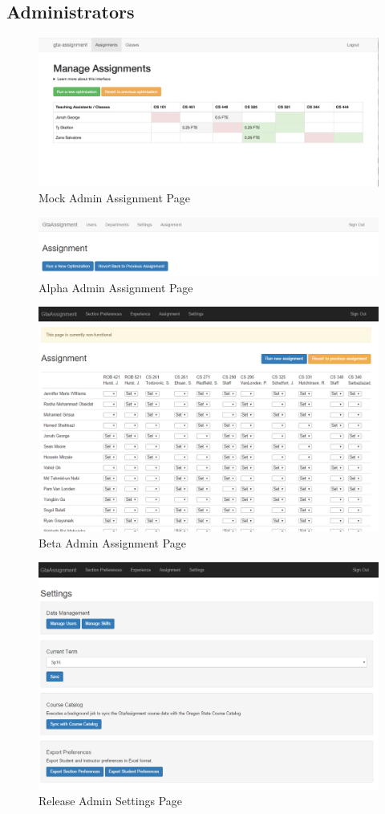 \subsection{Administrators}

\begin{figure}[!htb]
  \centering
  \includegraphics[width=0.75\linewidth]{images/administrator-assignment-design.png}
  \caption{Mock Admin Assignment Page}
\end{figure}

\begin{figure}[!htb]
  \centering
  \includegraphics[width=0.75\linewidth]{images/administrator-assignment-alpha.png}
  \caption{Alpha Admin Assignment Page}
\end{figure}

\begin{figure}[!htb]
  \centering
  \includegraphics[width=0.75\linewidth]{images/administrator-assignment-beta.png}
  \caption{Beta Admin Assignment Page}
\end{figure}

\begin{figure}[!htb]
  \centering
  \includegraphics[width=0.75\linewidth]{images/administrator-settings-beta.png}
  \caption{Release Admin Settings Page}
\end{figure}

